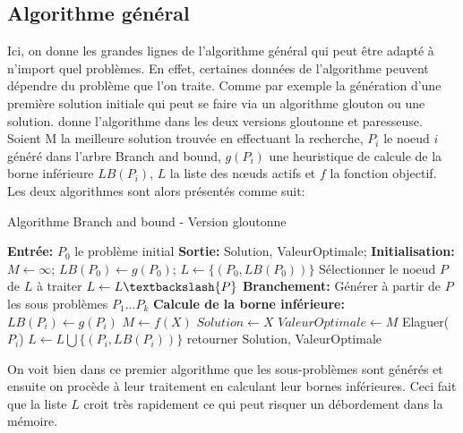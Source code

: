 \documentclass[12pt,a4paper,oneside]{book}
\theoremstyle{definition}
\begin{document}
	\subsection{Algorithme général}
	Ici, on donne les grandes lignes de l'algorithme général qui peut être adapté à n'import quel problèmes. En effet, certaines données de l'algorithme peuvent dépendre du problème que l'on traite. Comme par exemple la génération d'une première solution initiale qui peut se faire via un algorithme glouton ou une solution.
	\cite{Clausen99branchand} donne l'algorithme dans les deux versions gloutonne et paresseuse.
	Soient M la meilleure solution trouvée en effectuant la recherche, $P_i$ le noeud $i$ généré dans l'arbre Branch and bound, $g(P_i)$ une heuristique de calcule de la borne inférieure $LB(P_i)$, $L$ la liste des nœuds actifs et $f$ la fonction objectif. Les deux algorithmes sont alors présentés comme suit:
	\begin{algorithm}[H]
		
		\caption{Algorithme Branch and bound - Version gloutonne}
		\SetAlgoLined
		\DontPrintSemicolon
		\textbf{Entrée:} $P_0$ le problème initial \;
		\textbf{Sortie:} Solution, ValeurOptimale;
		\textbf{Initialisation:} $ M \gets \infty $; $LB(P_0) \gets g(P_0)$; $L \gets \{(P_0,LB(P_0))\}$\;
		{
			Sélectionner le noeud $P$ de $L$ à traiter \;
			$L \gets L \textbackslash \{P\} $   \;
			\textbf{Branchement:} Générer à partir de $P$ les sous problèmes $P_1 ... P_k$ \;
			{
				\textbf{Calcule de la borne inférieure:} $LB(P_i) \gets g(P_i)$ \;
				{
					$M \gets f(X)$ \;
					$Solution \gets X$ \;
					$ValeurOptimale \gets M$ \;
				}
				{
					{
						Elaguer($P_i$) \;
					}
					{
						$L \gets L \bigcup \{(P_i,LB(P_i))\} $ \;
					}
				}
			}
			retourner Solution, ValeurOptimale \; 
		}
	\end{algorithm}

	On voit bien dans ce premier algorithme que les sous-problèmes sont générés et ensuite on procède à leur traitement en calculant leur bornes inférieures. Ceci fait que la liste $L$ croit très rapidement ce qui peut risquer un débordement dans la mémoire.
\end{document}
